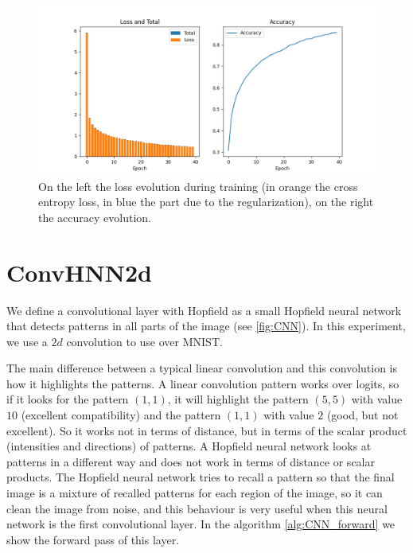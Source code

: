\begin{figure}[htbp]
    \centering
    \includegraphics[width=0.9\linewidth]{Figures/asMLP.png}
    \caption{On the left the loss evolution during training (in orange the cross entropy loss, in blue the part due to the regularization), on the right the accuracy evolution.}
    \label{fig:asMLP}
\end{figure}

\section{ConvHNN2d}
We define a convolutional layer with Hopfield as a small Hopfield neural network that detects patterns in all parts of the image (see \cref{fig:CNN}). In this experiment, we use a $2d$ convolution to use over MNIST.

\noindent The main difference between a typical linear convolution and this convolution is how it highlights the patterns. A linear convolution pattern works over logits, so if it looks for the pattern $\left(1,1\right)$, it will highlight the pattern $\left(5,5\right)$ with value $10$ (excellent compatibility) and the pattern $\left(1,1\right)$ with value $2$ (good, but not excellent). So it works not in terms of distance, but in terms of the scalar product (intensities and directions) of patterns. A Hopfield neural network looks at patterns in a different way and does not work in terms of distance or scalar products. The Hopfield neural network tries to recall a pattern so that the final image is a mixture of recalled patterns for each region of the image, so it can clean the image from noise, and this behaviour is very useful when this neural network is the first convolutional layer. In the algorithm \ref{alg:CNN_forward} we show the forward pass of this layer.

